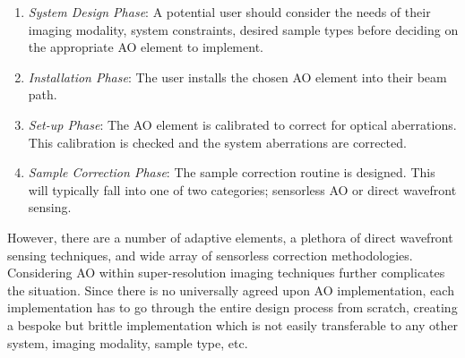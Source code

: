 \begin{enumerate}
	\item \textit{System Design Phase}: A potential user should consider 
	the needs of their imaging modality, system constraints, desired 
	sample types before deciding on the appropriate AO element to 
	implement.
	\item \textit{Installation Phase}: The user installs the chosen AO 
	element into their beam path.
	\item \textit{Set-up Phase}: The AO element is calibrated to correct 
	for optical aberrations. This calibration is checked and the system 
	aberrations are corrected.
	\item \textit{Sample Correction Phase}: The sample correction routine 
	is designed. This will typically fall into one of two categories; 
	sensorless AO or direct wavefront sensing.
\end{enumerate}  

However, there are a number of adaptive elements\cite{olivier2002advanced}, 
a plethora of direct wavefront sensing techniques\cite{antonello2014optimisation,trumper2016instantaneous,
	schwertner2004measurement}, and wide array of 
sensorless correction methodologies\cite{burke2015adaptive,booth2002adaptive,
	fienup2003aberration,antonello2020multi,debarre2007image}. 
Considering AO within super-resolution imaging techniques further complicates
the 
situation\cite{debarre2008adaptive,booth2015aberrations,thomas2015enhanced}.
Since there is no universally agreed upon AO implementation, each 
implementation has to go through the entire design process from scratch, 
creating a bespoke but brittle implementation which is not easily transferable
to any other system, imaging modality, sample type, etc. 

